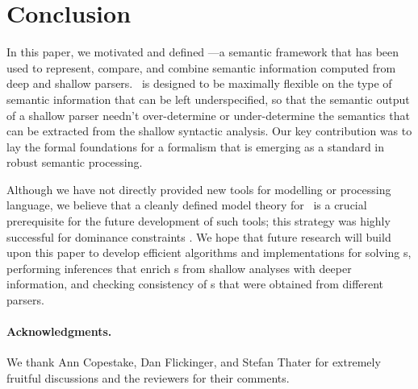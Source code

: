 \section{Conclusion}
\label{sec:conclusion}

In this paper, we motivated and defined \rmrs---a semantic framework
that has been used to represent, compare, and combine semantic
information computed from deep and shallow parsers.  \rmrs\ is
designed to be maximally flexible on the type of semantic information
that can be left underspecified, so that the semantic output of a
shallow parser needn't over-determine or under-determine the semantics
that can be extracted from the shallow syntactic analysis.  Our key
contribution was to lay the formal foundations for a formalism that is
emerging as a standard in robust semantic processing.

Although we have not directly provided new tools for modelling or
processing language, we believe that a cleanly defined model theory
for \rmrs\ is a crucial prerequisite for the future development of
such tools; this strategy was highly successful for dominance
constraints \cite{Althaus_etal:JoA}. We hope that future research will
build upon this paper to develop efficient algorithms and
implementations for solving \rmrs s, performing inferences that enrich
\rmrs s from shallow analyses with deeper information, and checking
consistency of \rmrs s that were obtained from different parsers.

\paragraph{Acknowledgments.} We thank Ann Copestake, Dan Flickinger,
and Stefan Thater for extremely fruitful discussions and the reviewers
for their comments.

